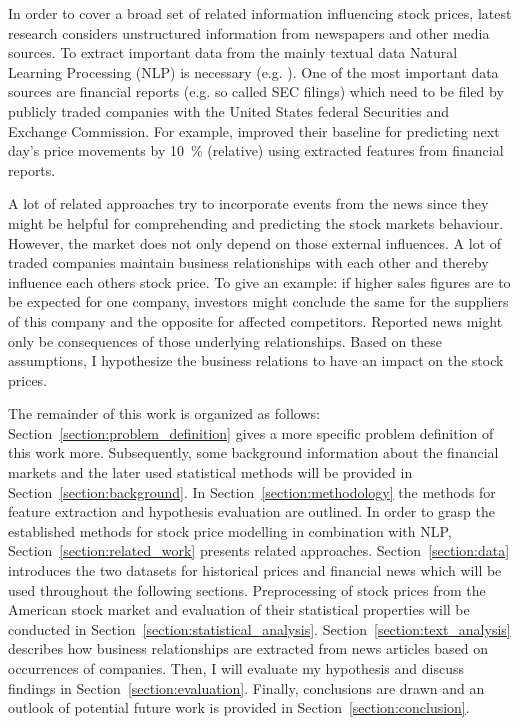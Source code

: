 In order to cover a broad set of related information influencing stock prices, latest research considers unstructured information from newspapers and other media sources. To extract important data from the mainly textual data Natural Learning Processing (NLP) is necessary (e.g. \cite{Yoshihara2014PredictingNetworks}). One of the most important data sources are financial reports (e.g. so called SEC filings) which need to be filed by publicly traded companies with the United States federal Securities and Exchange Commission. For example, \citet{Lee2014OnPrediction} improved their baseline for predicting next day’s price movements by 10~\% (relative) using extracted features from financial reports.

A lot of related approaches try to incorporate events from the news since they might be helpful for comprehending and predicting the stock markets behaviour. However, the market does not only depend on those external influences. A lot of traded companies maintain business relationships with each other and thereby influence each others stock price. To give an example: if higher sales figures are to be expected for one company, investors might conclude the same for the suppliers of this company and the opposite for affected competitors. Reported news might only be consequences of those underlying relationships. Based on these assumptions, I hypothesize the business relations to have an impact on the stock prices.

%  
The remainder of this work is organized as follows: Section~\ref{section:problem_definition} gives a more specific problem definition of this work more. Subsequently, some background information about the financial markets and the later used statistical methods will be provided in Section~\ref{section:background}. In Section~\ref{section:methodology} the methods for feature extraction and hypothesis evaluation are outlined. In order to grasp the established methods for stock price modelling in combination with NLP, Section~\ref{section:related_work} presents related approaches. Section~\ref{section:data} introduces the two datasets for historical prices and financial news which will be used throughout the following sections. Preprocessing of stock prices from the American stock market and evaluation of their statistical properties will be conducted in Section~\ref{section:statistical_analysis}. Section~\ref{section:text_analysis} describes how business relationships are extracted from news articles based on occurrences of companies. Then, I will evaluate my hypothesis and discuss findings in Section~\ref{section:evaluation}. Finally, conclusions are drawn and an outlook of potential future work is provided in Section~\ref{section:conclusion}.





